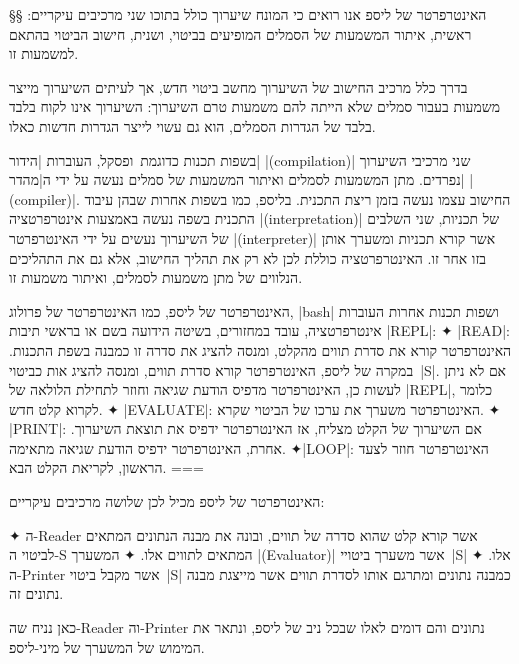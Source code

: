 §§ האינטרפרטר של ליספ
אנו רואים כי המונח שיערוך כולל בתוכו שני מרכיבים עיקריים: ראשית, איתור המשמעות
של הסמלים המופיעים בביטוי, ושנית, חישוב הביטוי בהתאם למשמעות זו.

בדרך כלל מרכיב החישוב של השיערוך מחשב ביטוי חדש, אך לעיתים השיערוך מייצר משמעות
בעבור סמלים שלא הייתה להם משמעות טרם השיערוך: השיערוך אינו לקוח בלבד
בלבד של הגדרות הסמלים, הוא גם עשוי לייצר הגדרות חדשות כאלו.

בשפות תכנות כדוגמת~\CPL ופסקל, העוברות \ע|הידור| \E|(compilation)| שני מרכיבי
השיערוך נפרדים. מתן המשמעות לסמלים ואיתור המשמעות של סמלים נעשה על ידי
ה\ע|מהדר| \E|(compiler)|. החישוב עצמו נעשה בזמן ריצת התכנית. בליספ, כמו בשפות
אחרות שבהן עיבוד התכנית בשפה נעשה באמצעות אינטרפרטציה \E|(interpretation)| של
תכניות, שני השלבים של השיערוך נעשים על ידי האינטרפרטר \E|(interpreter)| אשר
קורא תכניות ומשערך אותן בזו אחר זו. האינטרפרטציה כוללת לכן לא רק את תהליך החישוב,
אלא גם את התהליכים הנלווים של מתן משמעות לסמלים, ואיתור משמעות זו.

\begin{minipage}\linewidth
  \footnotesize
  \begin{mdframed}[backgroundcolor=Lavender!20]
    האינטרפרטר של ליספ, כמו האינטרפרטר של פרולוג, \E|bash| ושפות תכנות אחרות
    העוברות אינטרפרטציה, עובד במחזורים, בשיטה הידועה בשם
    או בראשי תיבות \E|REPL|:
    ✦ \E|READ|: האינטרפרטר קורא את סדרת תווים מהקלט, ומנסה להציג את סדרה זו
    כמבנה בשפת התכנות. במקרה של ליספ, האינטרפרטר קורא סדרת תווים, ומנסה להציג
    אות כביטוי~\E|S|. אם לא ניתן לעשות כן, האינטרפרטר מדפיס הודעת שגיאה וחוזר
    לתחילת הלולאה של \E|REPL|, כלומר לקרוא קלט חדש.
    ✦ \E|EVALUATE|: האינטרפרטר משערך את ערכו של הביטוי שקרא.
    ✦ \E|PRINT|: אם השיערוך של הקלט מצליח, אז האינטרפרטר ידפיס את תוצאת
    השיערוך. אחרת, האינטרפרטר ידפיס הודעת שגיאה מתאימה.
    ✦\E|LOOP|: האינטרפרטר חוזר לצעד הראשון, לקריאת הקלט הבא.
===
  \end{mdframed}
\end{minipage}

האינטרפרטר של ליספ מכיל לכן שלושה מרכיבים עיקריים:
\begin{enumerate}
  ✦ ה-Reader אשר קורא קלט שהוא סדרה של תווים, ובונה את מבנה הנתונים המתאים
  לביטוי ה-S המתאים לתווים אלו.
  ✦ המשערך \E|(Evaluator)| אשר משערך ביטויי~\E|S| אלו.
  ✦ ה-Printer אשר מקבל ביטוי~\E|S| כמבנה נתונים ומתרגם אותו לסדרת תווים אשר
  מייצגת מבנה נתונים זה.
\end{enumerate}

כאן נניח שה-Reader וה-Printer נתונים והם דומים לאלו שבכל ניב של ליספ, ונתאר את
המימוש של המשערך של מיני-ליספ.

